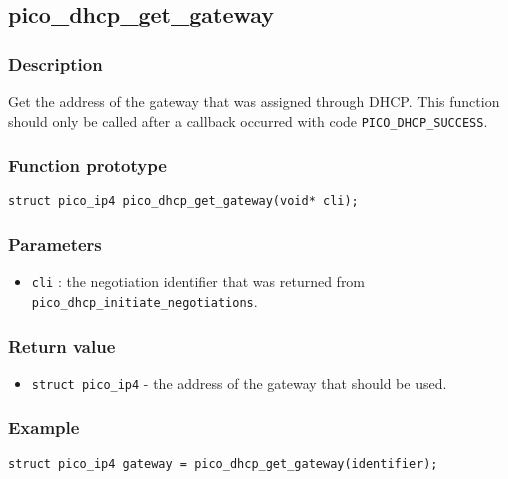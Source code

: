 \subsection{pico\_dhcp\_get\_gateway}

\subsubsection*{Description}
Get the address of the gateway that was assigned through DHCP. This function should
only be called after a callback occurred with code \texttt{PICO\_DHCP\_SUCCESS}. 

\subsubsection*{Function prototype}
\texttt{struct pico\_ip4 pico\_dhcp\_get\_gateway(void* cli);}

\subsubsection*{Parameters}
\begin{itemize}[noitemsep]
\item \texttt{cli} : the negotiation identifier that was returned from
\texttt{pico\_dhcp\_initiate\_negotiations}.
\end{itemize}

\subsubsection*{Return value}
\begin{itemize}[noitemsep]
\item \texttt{struct pico\_ip4} - the address of the gateway that should be used. 
\end{itemize}


\subsubsection*{Example}
\begin{verbatim}
struct pico_ip4 gateway = pico_dhcp_get_gateway(identifier);
\end{verbatim}
